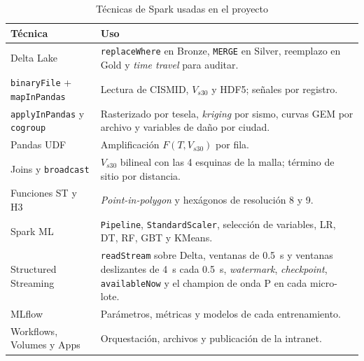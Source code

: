 \documentclass[conference]{IEEEtran}%
\newcommand{\vs}{V_{s30}}
\begin{document}
\begin{table}[H]
\centering
\caption{Técnicas de Spark usadas en el proyecto}
\label{tab:spark}
\footnotesize
\renewcommand{\arraystretch}{1.1}
\begin{tabularx}{\columnwidth}{>{\raggedright\arraybackslash}p{2.35cm} Y}
\toprule
\textbf{Técnica} & \textbf{Uso} \\
\midrule
Delta Lake & \texttt{replaceWhere} en Bronze, \texttt{MERGE} en Silver, reemplazo en Gold y \emph{time travel} para auditar. \\
\texttt{binaryFile} + \texttt{mapInPandas} & Lectura de CISMID, $\vs$ y HDF5; señales por registro. \\
\texttt{applyInPandas} y \texttt{cogroup} & Rasterizado por tesela, \emph{kriging} por sismo, curvas GEM por archivo y variables de daño por ciudad. \\
Pandas UDF & Amplificación $F(T,\vs)$ por fila. \\
Joins y \texttt{broadcast} & $\vs$ bilineal con las 4 esquinas de la malla; término de sitio por distancia. \\
Funciones ST y H3 & \emph{Point-in-polygon} y hexágonos de resolución 8 y 9. \\
Spark ML & \texttt{Pipeline}, \texttt{StandardScaler}, selección de variables, LR, DT, RF, GBT y KMeans. \\
Structured Streaming & \texttt{readStream} sobre Delta, ventanas de 0.5~s y ventanas deslizantes de 4~s cada 0.5~s, \emph{watermark}, \emph{checkpoint}, \texttt{availableNow} y el champion de onda P en cada micro-lote. \\
MLflow & Parámetros, métricas y modelos de cada entrenamiento. \\
Workflows, Volumes y Apps & Orquestación, archivos y publicación de la intranet. \\
\bottomrule
\end{tabularx}
\end{table}
\end{document}
